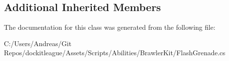 \subsection*{Additional Inherited Members}


The documentation for this class was generated from the following file\+:\begin{DoxyCompactItemize}
\item 
C\+:/\+Users/\+Andreas/\+Git Repos/dockitleague/\+Assets/\+Scripts/\+Abilities/\+Brawler\+Kit/Flash\+Grenade.\+cs\end{DoxyCompactItemize}
